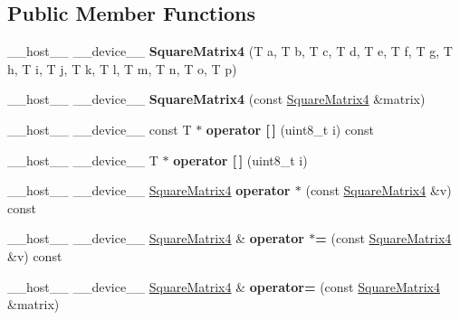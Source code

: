\subsection*{Public Member Functions}
\begin{DoxyCompactItemize}
\item 
\+\_\+\+\_\+host\+\_\+\+\_\+ \+\_\+\+\_\+device\+\_\+\+\_\+ {\bfseries Square\+Matrix4} (T a, T b, T c, T d, T e, T f, T g, T h, T i, T j, T k, T l, T m, T n, T o, T p)\hypertarget{class_square_matrix4_a9182db1e12bd3ff20d7ccdf5ed25c156}{}\label{class_square_matrix4_a9182db1e12bd3ff20d7ccdf5ed25c156}

\item 
\+\_\+\+\_\+host\+\_\+\+\_\+ \+\_\+\+\_\+device\+\_\+\+\_\+ {\bfseries Square\+Matrix4} (const \hyperlink{class_square_matrix4}{Square\+Matrix4} \&matrix)\hypertarget{class_square_matrix4_a3d2f4a1135af79f7e86e02426abe2319}{}\label{class_square_matrix4_a3d2f4a1135af79f7e86e02426abe2319}

\item 
\+\_\+\+\_\+host\+\_\+\+\_\+ \+\_\+\+\_\+device\+\_\+\+\_\+ const T $\ast$ {\bfseries operator \mbox{[}$\,$\mbox{]}} (uint8\+\_\+t i) const\hypertarget{class_square_matrix4_af20a47c9f0b1eada3e31273d2cb76de9}{}\label{class_square_matrix4_af20a47c9f0b1eada3e31273d2cb76de9}

\item 
\+\_\+\+\_\+host\+\_\+\+\_\+ \+\_\+\+\_\+device\+\_\+\+\_\+ T $\ast$ {\bfseries operator \mbox{[}$\,$\mbox{]}} (uint8\+\_\+t i)\hypertarget{class_square_matrix4_ac748c208ebdb0090978832fae8836f0a}{}\label{class_square_matrix4_ac748c208ebdb0090978832fae8836f0a}

\item 
\+\_\+\+\_\+host\+\_\+\+\_\+ \+\_\+\+\_\+device\+\_\+\+\_\+ \hyperlink{class_square_matrix4}{Square\+Matrix4} {\bfseries operator $\ast$} (const \hyperlink{class_square_matrix4}{Square\+Matrix4} \&v) const\hypertarget{class_square_matrix4_a7cfeb42d0147390448c69b6f4ba74ee0}{}\label{class_square_matrix4_a7cfeb42d0147390448c69b6f4ba74ee0}

\item 
\+\_\+\+\_\+host\+\_\+\+\_\+ \+\_\+\+\_\+device\+\_\+\+\_\+ \hyperlink{class_square_matrix4}{Square\+Matrix4} \& {\bfseries operator $\ast$=} (const \hyperlink{class_square_matrix4}{Square\+Matrix4} \&v) const\hypertarget{class_square_matrix4_af44d511c4d55102c4f72d99692345332}{}\label{class_square_matrix4_af44d511c4d55102c4f72d99692345332}

\item 
\+\_\+\+\_\+host\+\_\+\+\_\+ \+\_\+\+\_\+device\+\_\+\+\_\+ \hyperlink{class_square_matrix4}{Square\+Matrix4} \& {\bfseries operator=} (const \hyperlink{class_square_matrix4}{Square\+Matrix4} \&matrix)\hypertarget{class_square_matrix4_a48e4130c7dc65e2ef42be5e4dbbab914}{}\label{class_square_matrix4_a48e4130c7dc65e2ef42be5e4dbbab914}


\end{DoxyCompactItemize}
